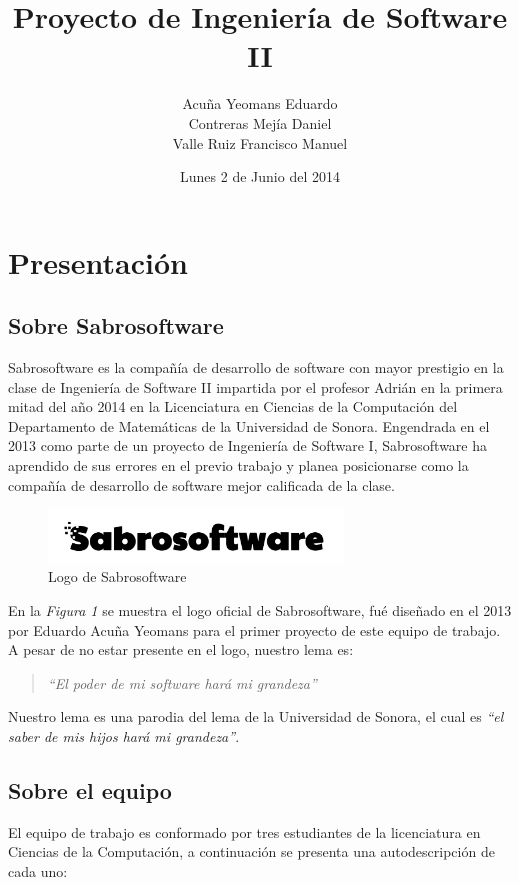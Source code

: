\documentclass[letterpaper]{article}
\title{Proyecto de Ingeniería de Software II}
\author{Acuña Yeomans Eduardo\\Contreras Mejía Daniel\\Valle Ruiz Francisco Manuel}
\date{Lunes 2 de Junio del 2014}
\begin{document}
\maketitle

\section{Presentación}

\subsection{Sobre Sabrosoftware}
Sabrosoftware es la compañía de desarrollo de software con mayor prestigio en la clase de Ingeniería de Software II impartida por el profesor Adrián en la primera mitad del año 2014 en la Licenciatura en Ciencias de la Computación del Departamento de Matemáticas de la Universidad de Sonora. Engendrada en el 2013 como parte de un proyecto de Ingeniería de Software I, Sabrosoftware ha aprendido de sus errores en el previo trabajo y planea posicionarse como la compañía de desarrollo de software mejor calificada de la clase.

\begin{figure}[h!]
  \centering
    \includegraphics[width=0.7\textwidth]{LogoSabrosoftware}
    \caption{Logo de Sabrosoftware}
\end{figure}

En la \emph{Figura 1} se muestra el logo oficial de Sabrosoftware, fué diseñado en el 2013 por Eduardo Acuña Yeomans para el primer proyecto de este equipo de trabajo. A pesar de no estar presente en el logo, nuestro lema es:

\begin{quote}
  \emph{``El poder de mi software hará mi grandeza''}
\end{quote}

Nuestro lema es una parodia del lema de la Universidad de Sonora, el cual es \emph{``el saber de mis hijos hará mi grandeza''}.

\subsection{Sobre el equipo}
El equipo de trabajo es conformado por tres estudiantes de la licenciatura en Ciencias de la Computación, a continuación se presenta una autodescripción de cada uno:
\end{document}
